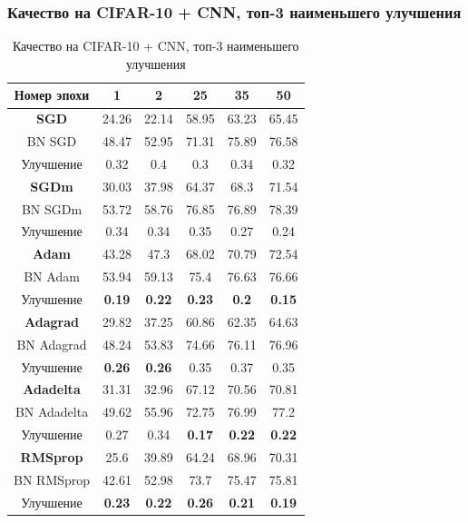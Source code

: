 \documentclass{beamer}
\begin{document}
\begin{frame}
	\frametitle{\footnotesize Качество на CIFAR-10 + CNN, топ-3 наименьшего улучшения}
\begin{table}
\centering
\scriptsize
\begin{tabular}{|c|c|c|c|c|c|}\hline
Номер эпохи & 1 & 2 & 25 & 35 & 50 \\\hline\hline
\textbf{SGD} & 24.26 & 22.14 & 58.95 & 63.23 & 65.45 \\\hline
BN SGD & 48.47 & 52.95 & 71.31 & 75.89 & 76.58 \\\hline
{Улучшение} & 0.32 & 0.4 & 0.3 & 0.34 & 0.32 \\\hline\hline
\textbf{SGDm} & 30.03 & 37.98 & 64.37 & 68.3 & 71.54 \\\hline
BN SGDm & 53.72 & 58.76 & 76.85 & 76.89 & 78.39 \\\hline
{Улучшение} & 0.34 & 0.34 & 0.35 & 0.27 & 0.24 \\\hline\hline
\color{red}\textbf{Adam} & 43.28 & 47.3 & 68.02 & 70.79 & 72.54 \\\hline
BN Adam & 53.94 & 59.13 & 75.4 & 76.63 & 76.66 \\\hline
{Улучшение} & \color{red}\textbf{0.19} & \color{red}\textbf{0.22} & \color{red}\textbf{0.23} &\color{red}\textbf{ 0.2} & \color{red}\textbf{0.15} \\\hline\hline
\textbf{Adagrad} & 29.82 & 37.25 & 60.86 & 62.35 & 64.63 \\\hline
BN Adagrad & 48.24 & 53.83 & 74.66 & 76.11 & 76.96 \\\hline
{Улучшение} & \color{red}\textbf{0.26} & \color{red}\textbf{0.26} & 0.35 & 0.37 & 0.35 \\\hline\hline
\color{red}\textbf{Adadelta} & 31.31 & 32.96 & 67.12 & 70.56 & 70.81 \\\hline
BN Adadelta & 49.62 & 55.96 & 72.75 & 76.99 & 77.2 \\\hline
{Улучшение} & 0.27 & 0.34 & \color{red}\textbf{0.17} & \color{red}\textbf{0.22} & \color{red}\textbf{0.22} \\\hline\hline
\color{red}\textbf{RMSprop} & 25.6 & 39.89 & 64.24 & 68.96 & 70.31 \\\hline
BN RMSprop & 42.61 & 52.98 & 73.7 & 75.47 & 75.81 \\\hline
{Улучшение} & \color{red}\textbf{0.23} & \color{red}\textbf{0.22} & \color{red}\textbf{0.26} & \color{red}\textbf{0.21} & \color{red}\textbf{0.19} \\\hline
\end{tabular}
\caption{\scriptsize Качество на CIFAR-10 + CNN, топ-3 наименьшего улучшения}
\end{table}
\end{frame}
\end{document}
